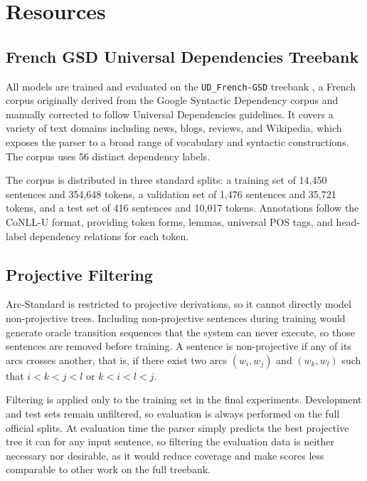 \documentclass[12pt,letterpaper]{article}
\begin{document}
\section{Resources}
\label{sec:resources}

\subsection{French GSD Universal Dependencies Treebank}
\label{subsec:french_gsd}

All models are trained and evaluated on the \texttt{UD\_French-GSD} treebank \cite{de2021universal}, a French corpus originally derived from the Google Syntactic Dependency corpus and manually corrected to follow Universal Dependencies guidelines. It covers a variety of text domains including news, blogs, reviews, and Wikipedia, which exposes the parser to a broad range of vocabulary and syntactic constructions. The corpus uses 56 distinct dependency labels.

The corpus is distributed in three standard splits: a training set of 14,450 sentences and 354,648 tokens, a validation set of 1,476 sentences and 35,721 tokens, and a test set of 416 sentences and 10,017 tokens. Annotations follow the CoNLL-U format, providing token forms, lemmas, universal POS tags, and head-label dependency relations for each token.

\subsection{Projective Filtering}
\label{subsec:projective_filtering}

Arc-Standard is restricted to projective derivations, so it cannot directly model non-projective trees. Including non-projective sentences during training would generate oracle transition sequences that the system can never execute, so those sentences are removed before training. A sentence is non-projective if any of its arcs crosses another, that is, if there exist two arcs $(w_i, w_j)$ and $(w_k, w_l)$ such that $i < k < j < l$ or $k < i < l < j$.

Filtering is applied only to the training set in the final experiments. Development and test sets remain unfiltered, so evaluation is always performed on the full official splits. At evaluation time the parser simply predicts the best projective tree it can for any input sentence, so filtering the evaluation data is neither necessary nor desirable, as it would reduce coverage and make scores less comparable to other work on the full treebank.
\end{document}
